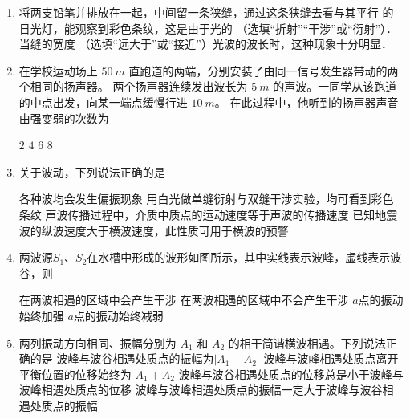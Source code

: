 
\begin{enumerate}
	\item
{}
将两支铅笔并排放在一起，中间留一条狭缝，通过这条狭缝去看与其平行
的日光灯，能观察到彩色条纹，这是由于光的 \underlinegap （选填“折射”“干涉”或“衍射”）．当缝的宽度 \underlinegap 
（选填“远大于”或“接近”）光波的波长时，这种现象十分明显．


\item 
{}
在学校运动场上 $ 50 \ m $ 直跑道的两端，分别安装了由同一信号发生器带动的两个相同的扬声器。
两个扬声器连续发出波长为 $ 5 \ m $ 的声波。一同学从该跑道的中点出发，向某一端点缓慢行进 $ 10 \ m $。
在此过程中，他听到的扬声器声音由强变弱的次数为  

\fourchoices
{$ 2 $}
{$ 4 $}
{$ 6 $}
{$ 8 $}

\item 
{}
关于波动，下列说法正确的是  

\fourchoices
{各种波均会发生偏振现象}
{用白光做单缝衍射与双缝干涉实验，均可看到彩色条纹}
{声波传播过程中，介质中质点的运动速度等于声波的传播速度}
{已知地震波的纵波速度大于横波速度，此性质可用于横波的预警}

\item 
{}
两波源$ S_{1} $、$ S_{2} $在水槽中形成的波形如图所示，其中实线表示波峰，虚线表示波谷，则  
\begin{figure}[h!]
	\centering
	
\end{figure}

\fourchoices
{在两波相遇的区域中会产生干涉}
{在两波相遇的区域中不会产生干涉}
{$ a $点的振动始终加强}
{$ a $点的振动始终减弱}


\item 
{}
两列振动方向相同、振幅分别为 $ A_{1} $ 和 $ A_{2} $ 的相干简谐横波相遇。下列说法正确的是  
\fourchoices
{波峰与波谷相遇处质点的振幅为$ | A_{1} - A_{2} | $}
{波峰与波峰相遇处质点离开平衡位置的位移始终为 $ A_{1} + A_{2} $}
{波峰与波谷相遇处质点的位移总是小于波峰与波峰相遇处质点的位移}
{波峰与波峰相遇处质点的振幅一定大于波峰与波谷相遇处质点的振幅}



\end{enumerate}

